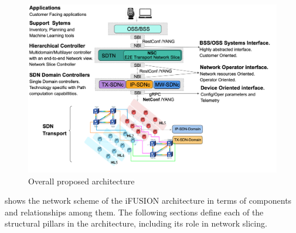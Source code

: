 \documentclass[journal,article,submit,moreauthors,pdftex]{Definitions/mdpi}
\begin{document}
\begin{figure}[tb]%
\centering
	\centering
		\includegraphics[width=\linewidth]{Figs/diagram-1.png}
\caption{Overall proposed architecture}
\label{fig:architecture}
\end{figure}

 shows the network scheme of the i\uppercase{FUSION} architecture in terms of components and relationships among them. The following sections define each of the structural pillars in the architecture, including its role in network slicing.



\end{document}
